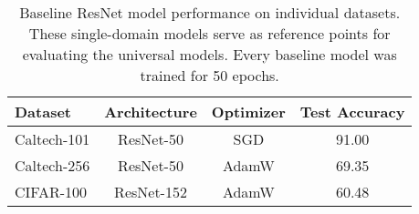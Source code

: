 \begin{table}[ht]
\centering
\caption{Baseline ResNet model performance on individual datasets. These single-domain models serve as reference points for evaluating the universal models. Every baseline model was trained for 50 epochs.}
\label{tab:baseline_model_results}
\begin{tabular}{lccc}
\toprule
Dataset & Architecture & Optimizer & Test Accuracy \\
\midrule
Caltech-101 & ResNet-50 & SGD & 91.00 \\
Caltech-256 & ResNet-50 & AdamW & 69.35 \\
CIFAR-100 & ResNet-152 & AdamW & 60.48 \\
\bottomrule
\end{tabular}
\end{table}
